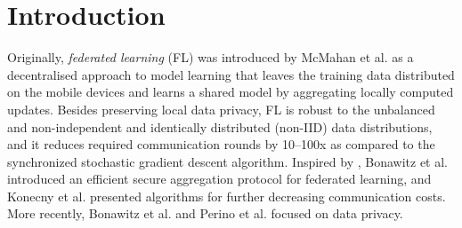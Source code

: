 \documentclass[runningheads]{llncs}
\begin{document}
\begin{abstract}
Federated learning (FL) is a machine learning setting where clients keep the training data decentralised and collaboratively train a model either under the coordination of a central server (centralised FL) or in a peer-to-peer network (decentralised FL). Correct orchestration is one of the main challenges. In this paper, we formally verify the correctness of two generic FL algorithms, a centralised and a decentralised one, using the CSP process calculus and the PAT model checker. The CSP models consist of CSP processes corresponding to generic FL algorithm instances. PAT automatically proves the correctness of the two generic FL algorithms by proving their deadlock freeness (safety property) and successful termination (liveness property). The CSP models are constructed bottom-up by hand as a faithful representation of the real Python code and is automatically checked top-down by PAT.


\end{abstract}
%
%
\section{Introduction}\label{sec: introduction}

Originally, {\em federated learning} (FL) was introduced by McMahan et al. \cite{McMahanMRHA17} as a decentralised approach to model learning that leaves the training data distributed on the mobile devices and learns a shared model by aggregating locally computed updates. Besides preserving local data privacy, FL is robust to the unbalanced and non-independent and identically distributed (non-IID) data distributions, and it reduces required communication rounds by 10–100x as compared to the synchronized stochastic gradient descent algorithm. Inspired by \cite{McMahanMRHA17}, Bonawitz et al. \cite{BonawitzIKMMPRS17} introduced an efficient secure aggregation protocol for federated learning, and Konecny et al. \cite{Konecny2017} presented algorithms for further decreasing communication costs. More recently, Bonawitz et al. \cite{BonawitzKMR22} and Perino et al. \cite{PerinoKLMK22} focused on data privacy.
\end{document}
